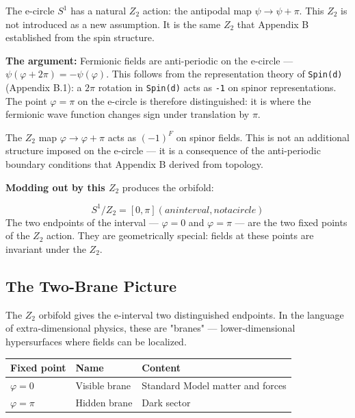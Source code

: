 \documentclass[aps,prd,preprint,superscriptaddress,longbibliography,floatfix]{revtex4-2}
\theoremstyle{remark}
\begin{document}
The e-circle $S^{1}$ has a natural $Z_{2}$ action: the antipodal map $\psi \to \psi + \pi$. This $Z_{2}$ is not introduced as a new assumption. It is the same $Z_{2}$ that Appendix B established from the spin structure.

\textbf{The argument:} Fermionic fields are anti-periodic on the e-circle --- $\psi(\varphi + 2\pi) = -\psi(\varphi)$. This follows from the representation theory of \texttt{Spin(d)} (Appendix B.1): a $2\pi$ rotation in \texttt{Spin(d)} acts as \texttt{-1} on spinor representations. The point $\varphi = \pi$ on the e-circle is therefore distinguished: it is where the fermionic wave function changes sign under translation by $\pi$.

The $Z_{2}$ map $\varphi \to \varphi + \pi$ acts as $(-1)^F$ on spinor fields. This is not an additional structure imposed on the e-circle --- it is a consequence of the anti-periodic boundary conditions that Appendix B derived from topology.

\textbf{Modding out by this $Z_{2}$} produces the orbifold:


\begin{equation}
    S^{1}/Z_{2} = [0, \pi]   (an interval, not a circle)
\end{equation}
The two endpoints of the interval --- $\varphi = 0$ and $\varphi = \pi$ --- are the two fixed points of the $Z_{2}$ action. They are geometrically special: fields at these points are invariant under the $Z_{2}$.



\subsection{The Two-Brane Picture}

The $Z_{2}$ orbifold gives the e-interval two distinguished endpoints. In the language of extra-dimensional physics, these are "branes" --- lower-dimensional hypersurfaces where fields can be localized.


\begin{table}[H]
\begin{ruledtabular}
\begin{tabular}{p{5.0cm}p{5.0cm}p{5.0cm}}
Fixed point & Name & Content \\
\hline
$\varphi = 0$ & Visible brane & Standard Model matter and forces \\
$\varphi = \pi$ & Hidden brane & Dark sector \\
\end{tabular}
\end{ruledtabular}
\end{table}
\end{document}
